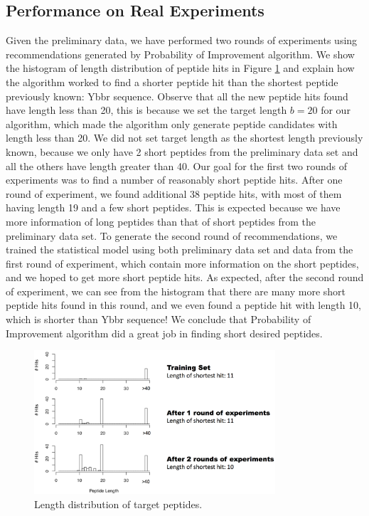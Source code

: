 \documentclass[opre,nonblindrev]{informs3} %
\begin{document}
\subsection{Performance on Real Experiments} \label{sec:experiment}
Given the preliminary data, we have performed two rounds of experiments using recommendations generated by Probability of Improvement algorithm. We show the histogram of length distribution of peptide hits in Figure \ref{fig:experiment} and explain how the algorithm worked to find a shorter peptide hit than the shortest peptide previously known: Ybbr sequence. Observe that all the new peptide hits found have length less than 20, this is because we set the target length $b = 20$ for our algorithm, which made the algorithm only generate peptide candidates with length less than 20. We did not set target length as the shortest length previously known, because we only have 2 short peptides from the preliminary data set and all the others have length greater than 40. Our goal for the first two rounds of experiments was to find a number of reasonably short peptide hits. After one round of experiment, we found additional 38 peptide hits, with most of them having length 19 and a few short peptides. This is expected because we have more information of long peptides than that of short peptides from the preliminary data set. To generate the second round of recommendations, we trained the statistical model using both preliminary data set and data from the first round of experiment, which contain more information on the short peptides, and we hoped to get more short peptide hits. As expected, after the second round of experiment, we can see from the histogram that there are many more short peptide hits found in this round, and we even found a peptide hit with length 10, which is shorter than Ybbr sequence! We conclude that Probability of Improvement algorithm did a great job in finding short desired peptides.

\begin{figure}[hpt] 
\center
\includegraphics[width=0.8\textwidth]{pic/experiment.png}
\caption{Length distribution of target peptides.}
\label{fig:experiment}
\end{figure}
\end{document}
